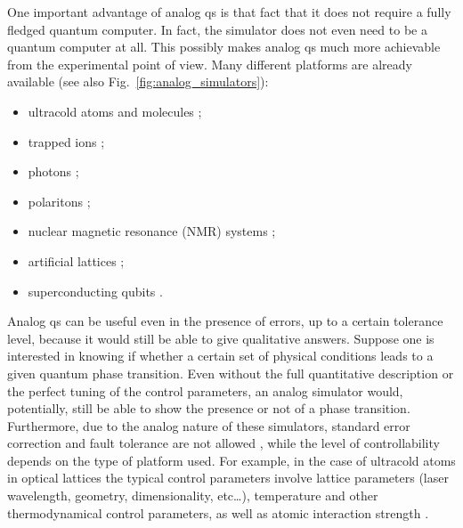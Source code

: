 One important advantage of analog \ac{qs} is that fact that it does not require a fully fledged quantum computer.
In fact, the simulator does not even need to be a quantum computer at all.
This possibly makes analog \ac{qs} much more achievable from the experimental point of view.
Many different platforms are already available (see also Fig.~\ref{fig:analog_simulators}):
\begin{itemize}
    \item ultracold atoms and molecules \cite{lewenstein2012ultracold, bloch2012ultracold, bloch2008ultracold, lin2009ultracold, muller2012ions, aidelsburger2011ultracold};
    \item trapped ions \cite{blatt2012trappedions, muller2012ions, johanning2009ions, schneider2012ions};
    \item photons \cite{aspuruguzik2012photonic, angelakis2017quantum};
    \item polaritons \cite{angelakis2017quantum, hartmann2006polaritons};
    \item nuclear magnetic resonance (NMR) systems \cite{somaroo1999simulation, tseng1999nmr};
    \item artificial lattices \cite{singha2011lattice};
    \item superconducting qubits \cite{houck2012superconducting, makhlin2001superconducting, devoret2004superconducting, you2005superconducting, pritchett2010superconducting}.
\end{itemize}

Analog \ac{qs} can be useful even in the presence of errors, up to a certain tolerance level, because it would still be able to give qualitative answers.
Suppose one is interested in knowing if whether a certain set of physical conditions leads to a given quantum phase transition.
Even without the full quantitative description or the perfect tuning of the control parameters, an analog simulator would, potentially, still be able to show the presence or not of a phase transition.
Furthermore, due to the analog nature of these simulators, standard error correction and fault tolerance are not allowed \cite{hauke2012simulators}, while the level of controllability depends on the type of platform used.
For example, in the case of ultracold atoms in optical lattices the typical control parameters involve lattice parameters (laser wavelength, geometry, dimensionality, etc\dots), temperature and other thermodynamical control parameters, as well as atomic interaction strength \cite{lewenstein2012ultracold}.


